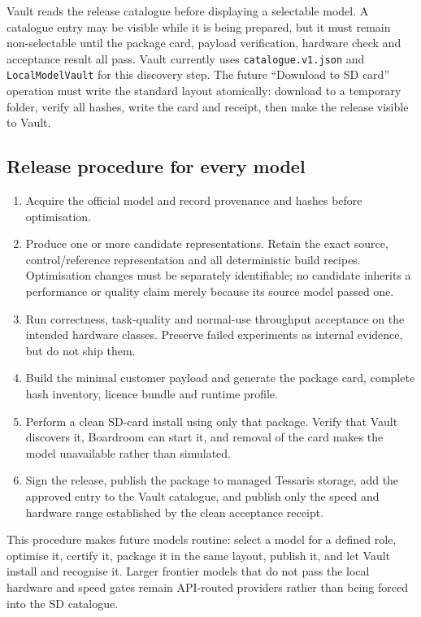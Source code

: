 Vault reads the release catalogue before displaying a selectable model.  A
catalogue entry may be visible while it is being prepared, but it must remain
non-selectable until the package card, payload verification, hardware check and
acceptance result all pass.  Vault currently uses
\texttt{catalogue.v1.json} and \texttt{LocalModelVault} for this discovery
step.  The future ``Download to SD card'' operation must write the standard
layout atomically: download to a temporary folder, verify all hashes, write the
card and receipt, then make the release visible to Vault.

\subsection{Release procedure for every model}

\begin{enumerate}
  \item Acquire the official model and record provenance and hashes before
  optimisation.
  \item Produce one or more candidate representations.  Retain the exact
  source, control/reference representation and all deterministic build recipes.
  Optimisation changes must be separately identifiable; no candidate inherits a
  performance or quality claim merely because its source model passed one.
  \item Run correctness, task-quality and normal-use throughput acceptance on
  the intended hardware classes.  Preserve failed experiments as internal
  evidence, but do not ship them.
  \item Build the minimal customer payload and generate the package card,
  complete hash inventory, licence bundle and runtime profile.
  \item Perform a clean SD-card install using only that package.  Verify that
  Vault discovers it, Boardroom can start it, and removal of the card makes the
  model unavailable rather than simulated.
  \item Sign the release, publish the package to managed Tessaris storage, add
  the approved entry to the Vault catalogue, and publish only the speed and
  hardware range established by the clean acceptance receipt.
\end{enumerate}

This procedure makes future models routine: select a model for a defined role,
optimise it, certify it, package it in the same layout, publish it, and let
Vault install and recognise it.  Larger frontier models that do not pass the
local hardware and speed gates remain API-routed providers rather than being
forced into the SD catalogue.


